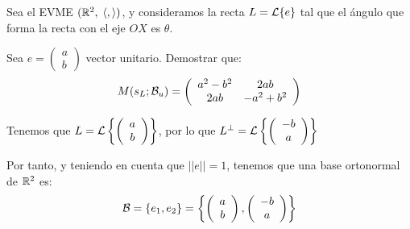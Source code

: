 \begin{ejercicio}\label{Ej42.SimRectaAng}
    Sea el EVME $(\mathbb{R}^2,\;\langle,\rangle)$, y consideramos la recta $L=\mathcal{L}\{e\}$ tal que el ángulo que forma la recta con el eje $OX$ es $\theta$.

    \begin{figure}[H]
        \centering
    \end{figure}

    Sea $e=\left(\begin{array}{c}
        a \\ b
    \end{array}\right)$ vector unitario. Demostrar que:
    \begin{equation*}
        M(s_L;\mathcal{B}_u) = \left(\begin{array}{cc}
            a^2-b^2 & 2ab \\
            2ab & -a^2+b^2
        \end{array}\right)
    \end{equation*}

    Tenemos que $L=\mathcal{L}\left\{\left(\begin{array}{c}
        a \\ b
    \end{array}\right)\right\}$, por lo que $L^\perp=\mathcal{L}\left\{\left(\begin{array}{c}
        -b \\ a
    \end{array}\right)\right\}$

    Por tanto, y teniendo en cuenta que $||e||=1$, tenemos que una base ortonormal de $\mathbb{R}^2$ es:
    \begin{equation*}
        \mathcal{B}=\{e_1, e_2\} = \left\{
        \left(\begin{array}{c}
            a \\ b
        \end{array}\right),
        \left(\begin{array}{c}
            -b \\ a
        \end{array}\right)
        \right\}
    \end{equation*}


\end{ejercicio}
